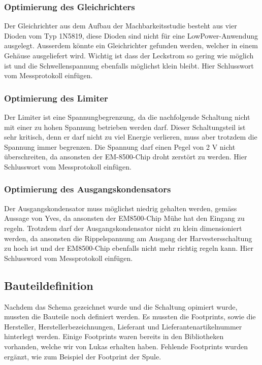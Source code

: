 \subsubsection{Optimierung des Gleichrichters}

Der Gleichrichter aus dem Aufbau der Machbarkeitsstudie besteht aus vier Dioden vom Typ 1N5819, diese Dioden sind nicht für eine LowPower-Anwendung ausgelegt. Ausserdem könnte ein Gleichrichter gefunden werden, welcher in einem Gehäuse ausgeliefert wird. Wichtig ist dass der Leckstrom so gering wie möglich ist und die Schwellenspannung ebenfalls möglichst klein bleibt. 
Hier Schlusswort vom Messprotokoll einfügen.

\subsubsection{Optimierung des Limiter}

Der Limiter ist eine Spannungbegrenzung, da die nachfolgende Schaltung nicht mit einer zu hohen Spannung betrieben werden darf. Dieser Schaltungsteil ist sehr kritisch, denn er darf nicht zu viel Energie verlieren, muss aber trotzdem die Spannung immer begrenzen. Die Spannung darf einen Pegel von 2 V nicht überschreiten, da ansonsten der EM-8500-Chip droht zerstört zu werden. 
Hier Schlusswort vom Messprotokoll einfügen.

\subsubsection{Optimierung des Ausgangskondensators}

Der Ausgangskondensator muss möglichst niedrig gehalten werden, gemäss Aussage von Yves, da ansonsten der EM8500-Chip Mühe hat den Eingang zu regeln. Trotzdem darf der Ausgangskondensator nicht zu klein dimensioniert werden, da ansonsten die Rippelspannung am Ausgang der Harvestersschaltung zu hoch ist und der EM8500-Chip ebenfalls nicht mehr richtig regeln kann.
Hier Schlussword vom Messprotokoll einfügen.


\subsection{Bauteildefinition}

Nachdem das Schema gezeichnet wurde und die Schaltung opimiert wurde, mussten die Bauteile noch definiert werden. Es mussten die Footprints, sowie die Hersteller, Herstellerbezeichnungen, Lieferant und Lieferantenartikelnummer hinterlegt werden. Einige Footprints waren bereits in den Bibliotheken vorhanden, welche wir von Lukas erhalten haben. Fehlende Footprints wurden ergänzt, wie zum Beispiel der Footprint der Spule.


